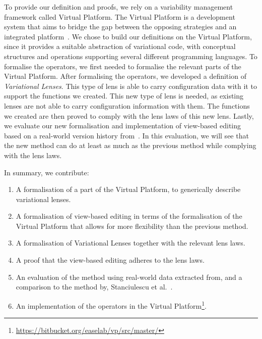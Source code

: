 To provide our definition and proofs, we rely on a variability management
framework called Virtual Platform. The Virtual Platform is a development system
that aims to bridge the gap between the opposing strategies \emph{\co} and
an integrated platform~\cite{mahmood2021}.
We chose to build our definitions on the Virtual Platform, since it provides a suitable abstraction of
variational code, with conceptual structures and operations supporting several 
different programming languages.
To formalise the operators, we first needed to formalise the relevant parts of the 
Virtual Platform. After formalising the operators, we developed a
definition of \emph{Variational Lenses}. This type of lens is able to carry
configuration data with it to support the functions we created. This new type of
lens is needed, as existing lenses are not able to carry configuration information
with them. The functions we created are then proved to comply with the lens laws 
of this new lens. Lastly, we evaluate our new formalisation and implementation of view-based editing
based on a real-world version history from~\cite{stuanciulescu2016}. In this evaluation,
we will see that the new method can do at least as much as the previous method
while complying with the lens laws. 

In summary, we contribute:
\begin{enumerate}
    \itemsep -.2em
    \item A formalisation of a part of the Virtual Platform, to generically describe variational lenses.
    \item A formalisation of view-based editing in terms of the formalisation of the Virtual Platform that allows for more flexibility than the previous method.
    \item A formalisation of Variational Lenses together with the relevant lens laws.
    \item A proof that the view-based editing adheres to the lens laws.
    \item An evaluation of the method using real-world data extracted from, and a comparison to the method by, Stanciulescu et al.~\cite{stuanciulescu2016}.
    \item An implementation of the operators in the Virtual Platform\footnote{\url{https://bitbucket.org/easelab/vp/src/master/}}.
\end{enumerate}
